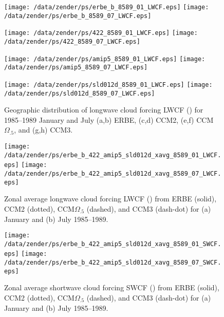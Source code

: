 \documentclass[twocolumn,final,11pt]{article}
\begin{document}
\begin{figure*}
\begin{center}
\texttt{[image: /data/zender/ps/erbe\_b\_8589\_01\_LWCF.eps]}%
\texttt{[image: /data/zender/ps/erbe\_b\_8589\_07\_LWCF.eps]}%

\texttt{[image: /data/zender/ps/422\_8589\_01\_LWCF.eps]}%
\texttt{[image: /data/zender/ps/422\_8589\_07\_LWCF.eps]}%

\texttt{[image: /data/zender/ps/amip5\_8589\_01\_LWCF.eps]}%
\texttt{[image: /data/zender/ps/amip5\_8589\_07\_LWCF.eps]}%

\texttt{[image: /data/zender/ps/sld012d\_8589\_01\_LWCF.eps]}%
\texttt{[image: /data/zender/ps/sld012d\_8589\_07\_LWCF.eps]}%
\end{center}
\caption[Geographic distribution of longwave cloud forcing LWCF
for 1985--1989 January and July ERBE, CCM2, CCM$\Omega_{.5}$, and CCM3]{
Geographic distribution of longwave cloud forcing LWCF (\wxmS) for
1985--1989 January and July (a,b) ERBE, (c,d) CCM2, (e,f)
CCM$\Omega_{.5}$, and (g,h) CCM3.  
\label{fig:8589_LWCF}}   
\end{figure*}
\clearpage

\begin{figure}
\begin{center}
\texttt{[image: /data/zender/ps/erbe\_b\_422\_amip5\_sld012d\_xavg\_8589\_01\_LWCF.eps]}\vfill
\texttt{[image: /data/zender/ps/erbe\_b\_422\_amip5\_sld012d\_xavg\_8589\_07\_LWCF.eps]}\vfill
\end{center}
\caption[Zonal average longwave cloud forcing LWCF from ERBE,
CCM, and ANV for 1985--1989 January and July]{
Zonal average longwave cloud forcing LWCF (\wxmS) from ERBE
(solid), CCM2 (dotted), CCM$\Omega_{.5}$ (dashed), and CCM3 (dash-dot)
for (a) January and (b) July 1985--1989. 
\label{fig:xavg_8589_LWCF}}   
\end{figure}

\begin{figure}
\begin{center}
\texttt{[image: /data/zender/ps/erbe\_b\_422\_amip5\_sld012d\_xavg\_8589\_01\_SWCF.eps]}\vfill
\texttt{[image: /data/zender/ps/erbe\_b\_422\_amip5\_sld012d\_xavg\_8589\_07\_SWCF.eps]}\vfill
\end{center}
\caption[Zonal average shortwave cloud forcing SWCF from ERBE,
CCM2, CCM$\Omega_{.5}$, and CCM3 for 1985--1989 January and July]{  
Zonal average shortwave cloud forcing SWCF (\wxmS) from ERBE
(solid), CCM2 (dotted), CCM$\Omega_{.5}$ (dashed), and CCM3 (dash-dot)
for (a) January and (b) July 1985--1989. 
\label{fig:xavg_8589_SWCF}}   
\end{figure}
\clearpage
\end{document}
